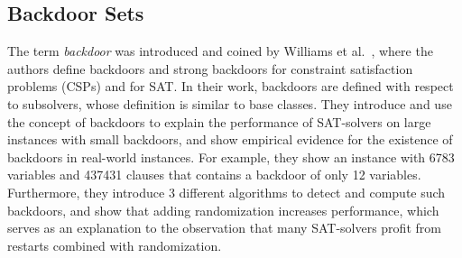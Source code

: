 \documentclass[11pt,a4paper]{article}
\theoremstyle{definition}
\theoremstyle{proposition}
\begin{document}
\subsection{Backdoor Sets}
The term \emph{backdoor} was introduced and coined by Williams et al.~\cite{typicalCaseComplexity}, where the authors define backdoors and strong backdoors for constraint satisfaction problems (CSPs) and for SAT. In their work, backdoors are defined with respect to subsolvers, whose definition is similar to base classes. They introduce and use the concept of backdoors to explain the performance of SAT-solvers on large instances with small backdoors, and show empirical evidence for the existence of backdoors in real-world instances. For example, they show an instance with 6783 variables and 437431 clauses that contains a backdoor of only 12 variables. Furthermore, they introduce 3 different algorithms to detect and compute such backdoors, and show that adding randomization increases performance, which serves as an explanation to the observation that many SAT-solvers profit from restarts combined with randomization. 
\end{document}
